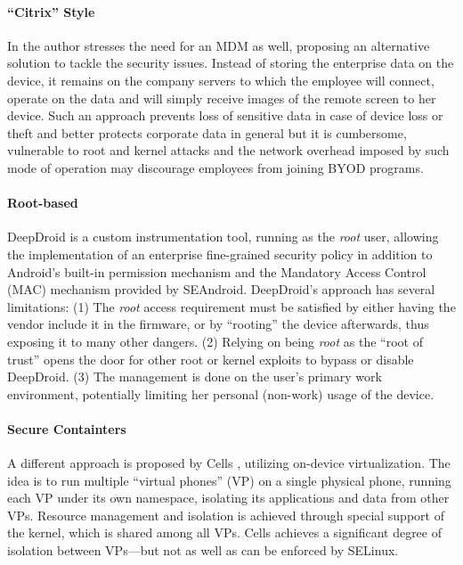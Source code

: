 \documentclass[11pt]{article}
\begin{document}
\paragraph{``Citrix'' Style} In \cite{NewSecurityPerspectivesAroundBYOD} the author stresses the need for an MDM as well, 
proposing an alternative solution to tackle the security issues. 
Instead of storing the enterprise data on the device, it remains on the company servers to which the employee will connect, 
operate on the data and will simply receive images of the remote screen to her device. Such an approach prevents 
loss of sensitive data in case of device loss or theft and better protects corporate data in general but it is cumbersome, vulnerable to root and kernel 
attacks and the network overhead imposed by such mode of operation may discourage employees from joining BYOD programs.

\paragraph{Root-based}
DeepDroid \cite{DeepDroid} is a custom instrumentation tool, running as the \emph{root} user, 
allowing the implementation of an enterprise fine-grained security policy in addition to Android's 
built-in permission mechanism \cite{AndroidSecurityAssessment} and the Mandatory Access Control (MAC) mechanism provided by SEAndroid.  
DeepDroid's approach has several limitations: 
(1) The \emph{root} access requirement must be satisfied by either having the vendor include it  in the firmware, or by ``rooting'' the device afterwards, 
thus exposing it to many other dangers.
(2) Relying on being \emph{root} as the ``root of trust'' opens the door for other root or kernel exploits to bypass or disable DeepDroid. 
(3) The management is done on the user's primary work environment, potentially limiting her personal (non-work) usage of the device.

\paragraph{Secure Containters}
A different approach is proposed by Cells \cite{Cells}, utilizing on-device virtualization. 
The idea is to run multiple ``virtual phones'' (VP) on a single physical phone, running each VP under its own namespace, 
isolating its applications and data from other VPs.
Resource management and isolation is achieved through special support of the kernel, which is shared among all VPs.
Cells achieves a significant degree of isolation between VPs---but not as well as can be enforced by SELinux.
\end{document}
